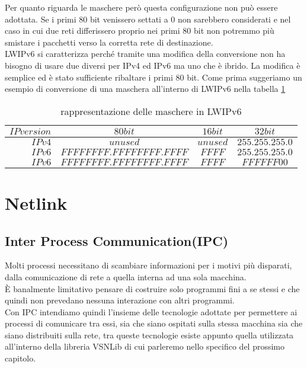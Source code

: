Per quanto riguarda le maschere per\`o questa configurazione non pu\`o essere adottata. Se i primi 80 bit venissero settati a 0 non sarebbero considerati e nel caso in cui due reti differissero proprio nei primi 80 bit non potremmo pi\`u smistare i pacchetti verso la corretta rete di destinazione.\\
LWIPv6 si caratterizza perch\'e tramite una modifica della conversione non ha bisogno di usare due  diversi per IPv4 ed IPv6 ma uno che \`e ibrido. La modifica \`e semplice ed \`e stato sufficiente ribaltare i primi 80 bit. Come prima suggeriamo un esempio di conversione di una maschera all'interno di LWIPv6 nella tabella \ref{tab:IPv4toIPv6 mask}

\begin{table}[h]                        %
\begin{center}                          %
\begin{tabular}{r|c|c|c}                  %
\hline
$IP version$ & $80 bit$ & $16 bit$ & $32 bit$\\
\hline  \hline        %
$IPv4$ & $unused$  &  $unused$  & $255.255.255.0$\\           %
\hline                                  %
$IPv6$ & $FFFFFFFF.FFFFFFFF.FFFF$ & $FFFF$ & $255.255.255.0$\\           %
\hline                                  %
$IPv6$ & $FFFFFFFF.FFFFFFFF.FFFF$ & $FFFF$ & $FFFFFF00$\\
\hline                           %
\end{tabular}
\caption[IPv4 to IPv6 mask conversion]{rappresentazione delle maschere in LWIPv6}\label{tab:IPv4toIPv6 mask}
\end{center}
\end{table}
\section{Netlink}
\subsection{Inter Process Communication(IPC)}
Molti processi necessitano di scambiare informazioni per i motivi pi\`u disparati, dalla comunicazione di rete a quella interna ad una sola macchina.\\
\`E banalmente limitativo pensare di costruire solo programmi fini a se stessi e che quindi non prevedano nessuna interazione con altri programmi.\\
Con IPC intendiamo quindi l'insieme delle tecnologie adottate per permettere ai processi di comunicare tra essi, sia che siano ospitati sulla stessa macchina sia che siano distribuiti sulla rete, tra queste tecnologie esiste appunto quella utilizzata all'interno della libreria VSNLib di cui parleremo nello specifico del prossimo capitolo.
